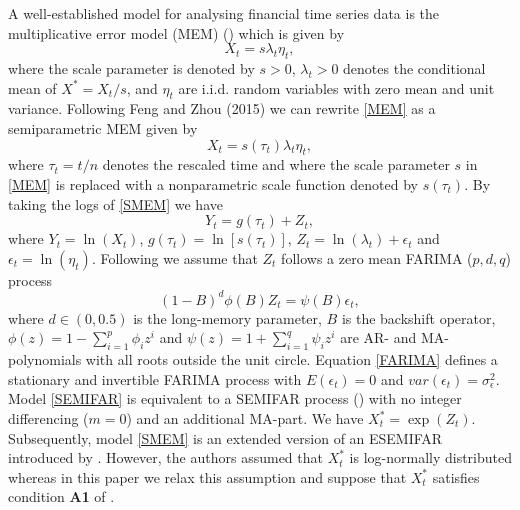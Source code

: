 \documentclass[12pt]{article}
\begin{document}
A well-established model for  analysing financial time series data is the multiplicative error model (MEM) (\cite{engle2002dynamic})  which is given by 
\begin{equation}
\label{MEM}
X_t=s \lambda_t \eta_t,
\end{equation}
where the scale parameter is denoted by $s >0$, $\lambda_t >0$ denotes the conditional mean of $X^*=X_t/s$, and $\eta_t$ are i.i.d. random variables with zero mean and unit variance. Following Feng and Zhou (2015) we can rewrite \eqref{MEM} as a semiparametric MEM given by
\begin{equation}
\label{SMEM}
X_t=s(\tau_t)\lambda_t \eta_t,
\end{equation}   
where $\tau_t=t/n$ denotes the rescaled time and where the scale parameter $s$ in \eqref{MEM} is replaced with a nonparametric scale function denoted by $s(\tau_t)$. 
By taking the logs of \eqref{SMEM} we have
\begin{equation}
\label{SEMIFAR}
Y_t=g(\tau_t) + Z_t,
\end{equation}
where $Y_t=\ln(X_t)$, $g(\tau_t)=\ln[s(\tau_t)]$, $Z_t=\ln(\lambda_t) + \epsilon_t$ and $\epsilon_t=\ln(\eta_t)$. Following \citet{beran2002semifar} we assume that $Z_t$ follows a zero mean FARIMA ($p, d, q$) process 
\begin{equation}
\label{FARIMA}
(1-B)^d\phi(B)Z_t =\psi(B)\epsilon_t,
\end{equation}
where $d \in (0,0.5)$ is the long-memory parameter, $B$ is the backshift operator, $\phi(z)=1-\sum_{i=1}^{p}\phi_iz^i$ and  $\psi(z)=1+\sum_{i=1}^{q}\psi_iz^i$ are AR- and MA-polynomials with all roots outside the unit circle. Equation \eqref{FARIMA} defines a stationary and invertible FARIMA process with $E(\epsilon_t)=0$ and $var(\epsilon_t)=\sigma^2_{\epsilon}$. Model \eqref{SEMIFAR} is equivalent to a SEMIFAR process (\cite{beran2002semifar}) with no integer differencing ($m=0$) and an additional MA-part. We have $X^*_t = \exp(Z_t)$. Subsequently, model \eqref{SMEM} is an extended version of an ESEMIFAR introduced by \citet{beran2015modelling}. However, the authors assumed that $X^*_t$ is log-normally distributed whereas in this paper we relax this assumption and suppose that $X_t^*$ satisfies condition \textbf{A1} of \citet{feng2020fractionally}.
\end{document}
